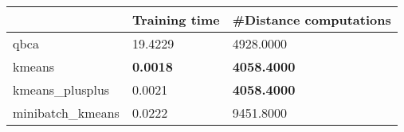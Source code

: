 \begin{table}[htbp]
\centering
\begin{tabular}{lll}
\toprule
 & Training time & #Distance computations \\
\midrule
qbca & 19.4229 & 4928.0000 \\
kmeans & \textbf{0.0018} & \textbf{4058.4000} \\
kmeans_plusplus & 0.0021 & \textbf{4058.4000} \\
minibatch_kmeans & 0.0222 & 9451.8000 \\
\bottomrule
\end{tabular}
\end{table}
